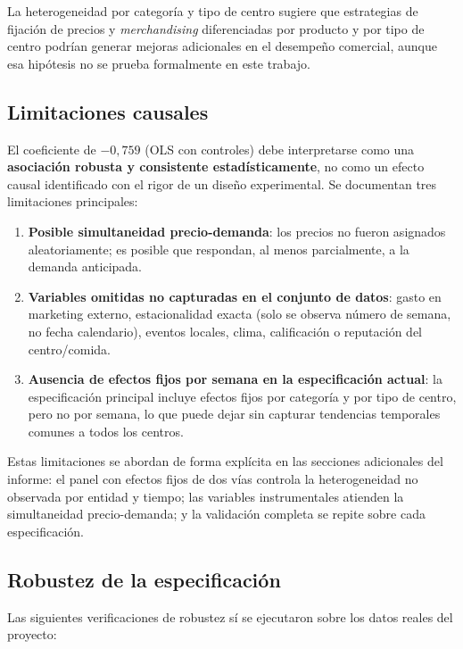 \documentclass[doc, a4paper, biblatex, floatsintext, longtable, babel]{apa7}
\begin{document}
La heterogeneidad por categor\'ia y tipo de centro sugiere que estrategias de fijación de precios y \textit{merchandising} diferenciadas por producto y por tipo de centro podr\'ian generar mejoras adicionales en el desempeño comercial, aunque esa hip\'otesis no se prueba formalmente en este trabajo.

\subsection{Limitaciones causales}
\label{subsec:limitaciones-causales}

El coeficiente de $-0,759$ (OLS con controles) debe interpretarse como una \textbf{asociaci\'on robusta y consistente estad\'isticamente}, no como un efecto causal identificado con el rigor de un dise\~no experimental. Se documentan tres limitaciones principales:

\begin{enumerate}
    \item \textbf{Posible simultaneidad precio-demanda}: los precios no fueron asignados aleatoriamente; es posible que respondan, al menos parcialmente, a la demanda anticipada.
    \item \textbf{Variables omitidas no capturadas en el conjunto de datos}: gasto en marketing externo, estacionalidad exacta (solo se observa n\'umero de semana, no fecha calendario), eventos locales, clima, calificaci\'on o reputaci\'on del centro/comida.
    \item \textbf{Ausencia de efectos fijos por semana en la especificaci\'on actual}: la especificaci\'on principal incluye efectos fijos por categor\'ia y por tipo de centro, pero no por semana, lo que puede dejar sin capturar tendencias temporales comunes a todos los centros.
\end{enumerate}

Estas limitaciones se abordan de forma expl\'icita en las secciones adicionales del informe: el panel con efectos fijos de dos v\'ias controla la heterogeneidad no observada por entidad y tiempo; las variables instrumentales atienden la simultaneidad precio-demanda; y la validaci\'on completa se repite sobre cada especificaci\'on.

\subsection{Robustez de la especificaci\'on}
\label{subsec:robustez}

Las siguientes verificaciones de robustez s\'i se ejecutaron sobre los datos reales del proyecto:
\end{document}
